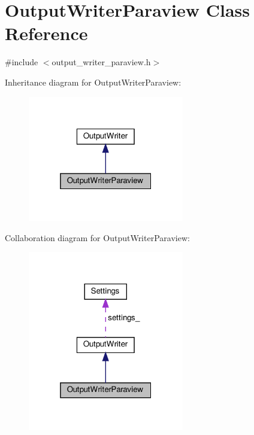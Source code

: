 \hypertarget{classOutputWriterParaview}{}\section{Output\+Writer\+Paraview Class Reference}
\label{classOutputWriterParaview}


{\ttfamily \#include $<$output\+\_\+writer\+\_\+paraview.\+h$>$}



Inheritance diagram for Output\+Writer\+Paraview\+:\nopagebreak
\begin{figure}[H]
\begin{center}
\leavevmode
\includegraphics[width=193pt]{classOutputWriterParaview__inherit__graph}
\end{center}
\end{figure}


Collaboration diagram for Output\+Writer\+Paraview\+:\nopagebreak
\begin{figure}[H]
\begin{center}
\leavevmode
\includegraphics[width=193pt]{classOutputWriterParaview__coll__graph}
\end{center}
\end{figure}

